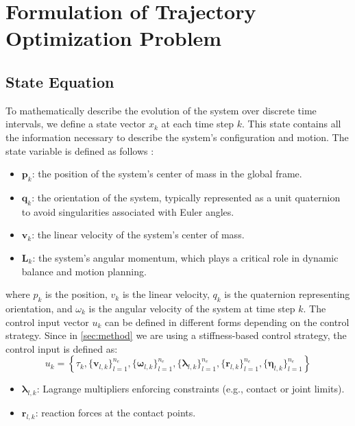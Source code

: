 \documentclass[main.tex]{subfiles}
\begin{document}
\section{Formulation of Trajectory Optimization Problem}
\label{sec:formulation}
\subsection{State Equation}
To mathematically describe the evolution of the system over discrete time intervals, we define a state vector $x_k$ at each time step $k$. This state contains all the information necessary to describe the system's configuration and motion. The state variable is defined as follows :
\begin{itemize}
    \item $\mathbf{p}_k$: the position of the system’s center of mass in the global frame.
    \item $\mathbf{q}_k$: the orientation of the system, typically represented as a unit quaternion to avoid singularities associated with Euler angles.
    \item $\mathbf{v}_k$: the linear velocity of the system's center of mass.
    \item $\mathbf{L}_k$: the system's angular momentum, which plays a critical role in dynamic balance and motion planning.
\end{itemize}
where $p_k$ is the position, $v_k$ is the linear velocity, $q_k$ is the quaternion representing orientation, and $\omega_k$ is the angular velocity of the system at time step $k$. 
The control input vector $u_k$ can be defined in different forms depending on the control strategy. Since in \ref{sec:method} we are using a stiffness-based control strategy, the control input is defined as:
\begin{equation}
    u_k = \left\{ \tau_k, \{ \mathbf{v}_{l,k} \}_{l=1}^{n_e}, \{ \boldsymbol{\omega}_{l,k} \}_{l=1}^{n_e}, \{ \boldsymbol{\lambda}_{l,k} \}_{l=1}^{n_e}, \{ \mathbf{r}_{l,k} \}_{l=1}^{n_e}, \{ \boldsymbol{\eta}_{l,k} \}_{l=1}^{n_e} \right\}
\end{equation}
\begin{itemize}
    \item $\boldsymbol{\lambda}_{l,k}$: Lagrange multipliers enforcing constraints (e.g., contact or joint limits).
    \item $\mathbf{r}_{l,k}$: reaction forces at the contact points.
\end{itemize}
\end{document}
